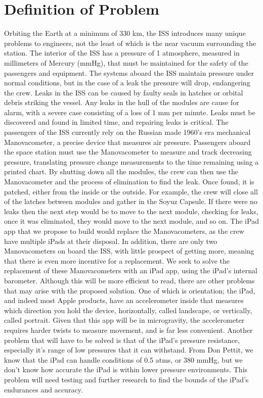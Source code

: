 \documentclass[onecolumn, draftclsnofoot,10pt, compsoc]{IEEEtran}
\begin{document}
\section{Definition of Problem}
Orbiting the Earth at a minimum of 330 km, the ISS introduces many unique problems to engineers, not the least of which is the near vacuum surrounding the station.
The interior of the ISS has a pressure of 1 atmosphere, measured in millimeters of Mercury (mmHg), that must be maintained for the safety of the passengers and equipment.
The systems aboard the ISS maintain pressure under normal conditions, but in the case of a leak the pressure will drop, endangering the crew.  Leaks in the ISS can be caused by faulty seals in hatches or orbital debris striking the vessel.
Any leaks in the hull of the modules are cause for alarm, with a severe case consisting of a loss of 1 mm per minute.
Leaks must be discovered and found in limited time, and repairing leaks is critical.
The passengers of the ISS currently rely on the Russian made 1960's era mechanical Manovacometer, a precise device that measures air pressure.
Passengers aboard the space station must use the Manovacometer to measure and track decreasing pressure, translating pressure change measurements to the time remaining using a printed chart.
By shutting down all the modules, the crew can then use the Manovacometer and the process of elimination to find the leak.
Once found, it is patched, either from the inside or the outside.
For example, the crew will close all of the latches between modules and gather in the Soyuz Capsule.
If there were no leaks then the next step would be to move to the next module, checking for leaks, once it was eliminated, they would move to the next module, and so on.
The iPad app that we propose to build would replace the Manovacometers, as the crew have multiple iPads at their disposal.
In addition, there are only two Manovacometers on board the ISS, with little prospect of getting more, meaning that there is even more incentive for a replacement.
We seek to solve the replacement of these Manovacometers with an iPad app, using the iPad's internal barometer.
Although this will be more efficient to read, there are other problems that may arise with the proposed solution.
One of which is orientation; the iPad, and indeed most Apple products, have an accelerometer inside that measures which direction you hold the device, horizontally, called landscape, or vertically, called portrait.
Given that this app will be in microgravity, the accelerometer requires harder twists to measure movement, and is far less convenient.
Another problem that will have to be solved is that of the iPad's pressure resistance, especially it's range of low pressures that it can withstand.
From Don Pettit, we know that the iPad can handle conditions of 0.5 atms, or 380 mmHg, but we don't know how accurate the iPad is within lower pressure environments.
This problem will need testing and further research to find the bounds of the iPad's endurances and accuracy.
\end{document}
